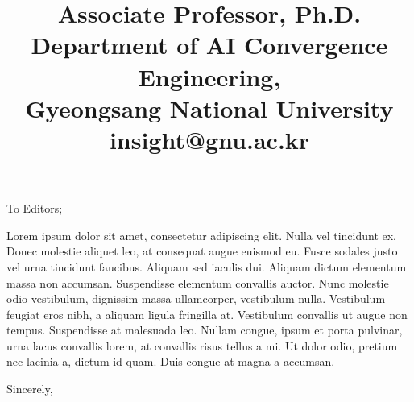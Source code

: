 \documentclass[12pt]{letter} %
\title{Associate Professor, Ph.D.\\
Department of AI Convergence Engineering,\\
Gyeongsang National University\\
insight@gnu.ac.kr}
\begin{document}
\begin{letter}{To Editors;}


\opening{}

Lorem ipsum dolor sit amet, consectetur adipiscing elit. Nulla vel tincidunt ex. Donec molestie aliquet leo, at consequat augue euismod eu. Fusce sodales justo vel urna tincidunt faucibus. Aliquam sed iaculis dui. Aliquam dictum elementum massa non accumsan. Suspendisse elementum convallis auctor. Nunc molestie odio vestibulum, dignissim massa ullamcorper, vestibulum nulla. Vestibulum feugiat eros nibh, a aliquam ligula fringilla at. Vestibulum convallis ut augue non tempus. Suspendisse at malesuada leo. Nullam congue, ipsum et porta pulvinar, urna lacus convallis lorem, at convallis risus tellus a mi. Ut dolor odio, pretium nec lacinia a, dictum id quam. Duis congue at magna a accumsan.



\closing{Sincerely,}
\endletter
\end{letter}
\end{document}
